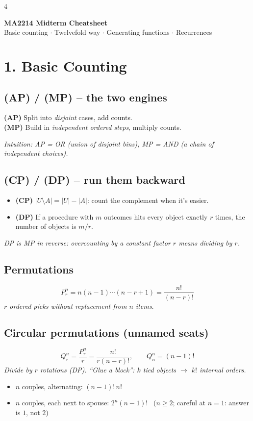 \documentclass[8pt]{extarticle}
\newcommand{\note}[1]{{\footnotesize\color{gray!70!black}\emph{#1}}}
\begin{document}
\begin{multicols}{4}

\begin{center}
{\Large\bfseries MA2214 Midterm Cheatsheet}\\
{\footnotesize Basic counting $\cdot$ Twelvefold way $\cdot$ Generating functions $\cdot$ Recurrences}
\end{center}

\section{1. Basic Counting}

\subsection*{(AP) / (MP) -- the two engines}
\begin{key}
\textbf{(AP)} Split into \emph{disjoint} cases, add counts.\\
\textbf{(MP)} Build in \emph{independent ordered steps}, multiply counts.
\end{key}
\note{Intuition: AP = OR (union of disjoint bins), MP = AND (a chain of independent choices).}

\subsection*{(CP) / (DP) -- run them backward}
\begin{itemize}
\item \textbf{(CP)} $|U\setminus A| = |U|-|A|$: count the complement when it's easier.
\item \textbf{(DP)} If a procedure with $m$ outcomes hits every object exactly $r$ times, the number of objects is $m/r$.
\end{itemize}
\note{DP is MP in reverse: overcounting by a constant factor $r$ means dividing by $r$.}

\subsection*{Permutations}
\[ P^n_r = n(n-1)\cdots(n-r+1) = \frac{n!}{(n-r)!} \]
\note{$r$ ordered picks without replacement from $n$ items.}

\subsection*{Circular permutations (unnamed seats)}
\[ Q^n_r = \frac{P^n_r}{r} = \frac{n!}{r(n-r)!}, \qquad Q^n_n=(n-1)! \]
\note{Divide by $r$ rotations (DP). ``Glue a block'': $k$ tied objects $\to$ $k!$ internal orders.}
\begin{itemize}
\item $n$ couples, alternating: $(n-1)!\,n!$
\item $n$ couples, each next to spouse: $2^n(n-1)!$ \ ($n\ge2$; careful at $n=1$: answer is $1$, not $2$)
\end{itemize}


\end{multicols}
\end{document}
